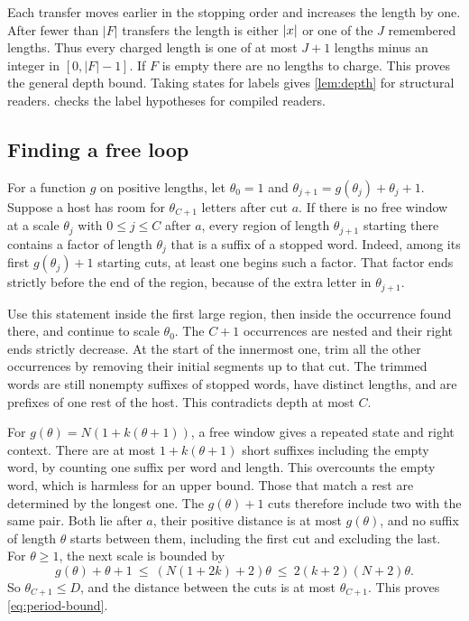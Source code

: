 Each transfer moves earlier in the stopping order and increases the
length by one. After fewer than $|F|$ transfers the length is either
$\lvert x\rvert$ or one of the $J$ remembered lengths. Thus every charged
length is one of at most $J+1$ lengths minus an integer in
$[0,|F|-1]$. If $F$ is empty there are no lengths to charge.
This proves the general depth bound. Taking states for labels gives
\cref{lem:depth} for structural readers.  checks
the label hypotheses for compiled readers.

\subsection{Finding a free loop}

For a function $g$ on positive lengths, let $\theta_0=1$ and
$\theta_{j+1}=g(\theta_j)+\theta_j+1$. Suppose a host has room for
$\theta_{C+1}$ letters after cut $a$. If there is no free window at a scale
$\theta_j$ with $0\le j\le C$ after $a$, every region of length
$\theta_{j+1}$ starting there contains a factor of length $\theta_j$ that is
a suffix of a stopped word. Indeed, among its first $g(\theta_j)+1$
starting cuts, at least one begins such a factor. That factor ends strictly
before the end of the region, because of the extra letter in
$\theta_{j+1}$.

Use this statement inside the first large region, then inside
the occurrence found there, and continue to scale $\theta_0$. The
$C+1$ occurrences are nested and their right ends strictly decrease.
At the start of the innermost one, trim all the other occurrences
by removing their initial segments up to that cut. The trimmed
words are still nonempty suffixes of stopped words, have distinct
lengths, and are prefixes of one rest of the host. This contradicts
depth at most $C$.

For $g(\theta)=N(1+k(\theta+1))$, a free window gives a repeated state and
right context. There are at most $1+k(\theta+1)$ short suffixes including
the empty word, by counting one suffix per word and length. This
overcounts the empty word, which is harmless for an upper bound.
Those that match a rest are determined by the longest one.
The $g(\theta)+1$ cuts therefore include two with the same pair.
Both lie after $a$, their positive distance is at most $g(\theta)$,
and no suffix of length $\theta$ starts between them, including
the first cut and excluding the last. For $\theta\ge 1$, the next
scale is bounded by
\[
   g(\theta)+\theta+1
   \ \le\ (N(1+2k)+2)\theta
   \ \le\ 2(k+2)(N+2)\theta.
\]
So $\theta_{C+1}\le D$, and the distance between the cuts is at most
$\theta_{C+1}$. This proves \eqref{eq:period-bound}.

